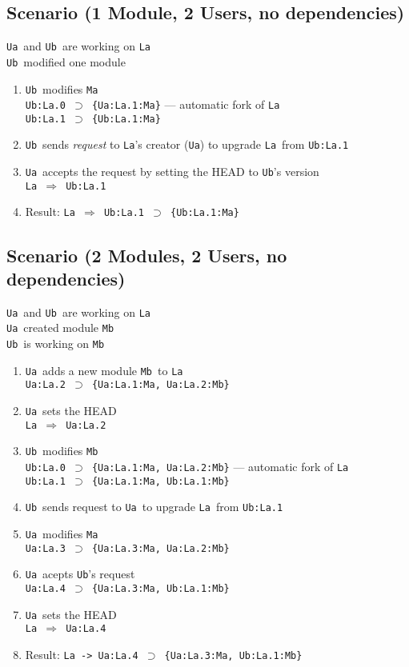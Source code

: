 \documentclass[10pt]{article}
\def\Ua{{\tt Ua}}
\def\Ub{{\tt Ub}}
\def\La{{\tt La}}
\def\Ma{{\tt Ma}}
\def\Mb{{\tt Mb}}
\def\headsto{${\Longrightarrow}$ }
\def\hto{\headsto}
\def\eq{${\supset}$ }
\begin{document}
	\subsection{Scenario (1 Module, 2 Users, no dependencies)}
		\Ua\ and \Ub\ are working on \La\\
		\Ub\ modified one module

		\begin{enumerate}
			\item{\Ub\ modifies \Ma\\
            		{\tt Ub:La.0 \eq \{Ua:La.1:Ma\}} --- automatic fork of \La\\
				{\tt Ub:La.1 \eq \{Ub:La.1:Ma\}}
			}
			\item{\Ub\ sends {\em request} to \La's creator (\Ua) to upgrade \La\ from {\tt Ub:La.1}}
			\item{\Ua\ accepts the request by setting the HEAD to \Ub's version\\
				{\tt La \hto  Ub:La.1}
			}
			\item{Result: {\tt La \hto  Ub:La.1 \eq \{Ub:La.1:Ma\}}}
		\end{enumerate}

	\subsection{Scenario (2 Modules, 2 Users, no dependencies)}

		\Ua\ and \Ub\ are working on \La\\ 
		\Ua\ created module \Mb\\
		\Ub\ is working on \Mb\
		
		\begin{enumerate}
			\item{\Ua\ adds a new module \Mb\ to \La\\
				{\tt Ua:La.2 \eq \{Ua:La.1:Ma, Ua:La.2:Mb\}}
			}
			\item{\Ua\ sets the HEAD\\
				{\tt La \hto Ua:La.2}
			}
			\item{\Ub\ modifies \Mb\\				
				{\tt Ub:La.0 \eq \{Ua:La.1:Ma, Ua:La.2:Mb\}} --- automatic fork of \La\\
				{\tt Ub:La.1 \eq \{Ua:La.1:Ma, Ub:La.1:Mb\}}
			}
			\item{\Ub\ sends request to \Ua\ to upgrade \La\ from {\tt Ub:La.1}}
			\item{\Ua\ modifies \Ma\\
				{\tt Ua:La.3 \eq \{Ua:La.3:Ma, Ua:La.2:Mb\}}
			}
			\item{\Ua\ acepts \Ub's request\\
				{\tt Ua:La.4 \eq \{Ua:La.3:Ma, Ub:La.1:Mb\}}
			}
			\item{\Ua\ sets the HEAD\\
				{\tt La \hto Ua:La.4}
			}
			\item{Result: {\tt La -> Ua:La.4 \eq \{Ua:La.3:Ma, Ub:La.1:Mb\}}}
		\end{enumerate}
\end{document}
